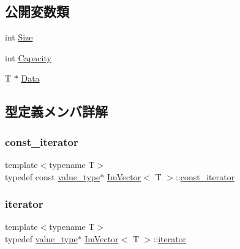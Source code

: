 \subsection*{公開変数類}
\begin{DoxyCompactItemize}
\item 
int \mbox{\hyperlink{class_im_vector_abbfd157947f66280d27b21d70a16df8d}{Size}}
\item 
int \mbox{\hyperlink{class_im_vector_abd24482b4d30d22e37582e521e5bfb33}{Capacity}}
\item 
T $\ast$ \mbox{\hyperlink{class_im_vector_ac0e46e8b30cb079d93c8f0aad7d7cbd0}{Data}}
\end{DoxyCompactItemize}


\subsection{型定義メンバ詳解}
\mbox{\label{class_im_vector_aedeac9c5080f9d6ce96ae837768ee4c4}} 
\subsubsection{\texorpdfstring{const\+\_\+iterator}{const\_iterator}}
{\footnotesize\ttfamily template$<$typename T$>$ \\
typedef const \mbox{\hyperlink{class_im_vector_a8bd77e4e7581d8e5f9e98d7c2f3c2a80}{value\+\_\+type}}$\ast$ \mbox{\hyperlink{class_im_vector}{Im\+Vector}}$<$ T $>$\+::\mbox{\hyperlink{class_im_vector_aedeac9c5080f9d6ce96ae837768ee4c4}{const\+\_\+iterator}}}

\mbox{\label{class_im_vector_a74b5478f1f6fd471cc71219bce483db6}} 
\subsubsection{\texorpdfstring{iterator}{iterator}}
{\footnotesize\ttfamily template$<$typename T$>$ \\
typedef \mbox{\hyperlink{class_im_vector_a8bd77e4e7581d8e5f9e98d7c2f3c2a80}{value\+\_\+type}}$\ast$ \mbox{\hyperlink{class_im_vector}{Im\+Vector}}$<$ T $>$\+::\mbox{\hyperlink{class_im_vector_a74b5478f1f6fd471cc71219bce483db6}{iterator}}}

